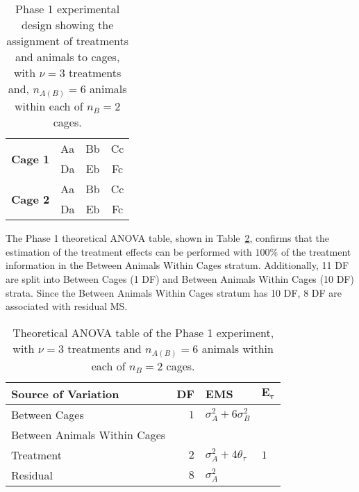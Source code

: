 \begin{table}[ht]
\centering
\itshape
\caption{Phase 1 experimental design showing the assignment of treatments and animals to cages, with $\nu = 3$ treatments and, $n_{A(B)} = 6$ animals within each of $n_B = 2$ cages.}
\begin{tabular}[t]{|c|ccc|}
\hline
\multirow{2}{*}{{\bf Cage 1}} & Aa & Bb & Cc \\
& Da & Eb & Fc  \\ \hline
\multirow{2}{*}{{\bf Cage 2}}  & Aa & Bb & Cc \\
& Da & Eb & Fc    \\   \hline 
\end{tabular} 
\label{tab:Phase1Des2}
\end{table}

The Phase 1 theoretical ANOVA table, shown in Table~\ref{tab:Phase1ANOVA2Chap4}, confirms that the estimation of the treatment effects can be performed with $100\%$ of the treatment information in the Between Animals Within Cages stratum. Additionally, 11 DF are split into Between Cages (1 DF) and Between Animals Within Cages (10 DF) strata. Since the Between Animals Within Cages stratum has 10 DF, 8 DF are associated with residual MS.

\begin{table}[ht]
\centering
 \caption{Theoretical ANOVA table of the Phase 1 experiment, with $\nu = 3$ treatments and $n_{A(B)} = 6$ animals within each of $n_B = 2$ cages.}
 \begin{tabular}[t]{lrll} 
 \toprule 
 \multicolumn{1}{l}{\textbf{Source of Variation}} & \multicolumn{1}{l}{\textbf{DF}} & \multicolumn{1}{l}{\textbf{EMS}}& \multicolumn{1}{l}{$\bm{E_{\tau}}$}\\ 
 \midrule 
 Between Cages & $1$ & $\sigma_{A}^2+6\sigma_{B}^2$ &\\ \hline
 Between Animals Within Cages &  &  &\\ 
 \quad Treatment & $2$ & $\sigma_{A}^2+4\theta_{\tau}$ &$1$\\ 
 \quad Residual & $8$ & $\sigma_{A}^2$ &\\ 
 \bottomrule 
 \end{tabular} 
 \label{tab:Phase1ANOVA2Chap4} 
\end{table} 

